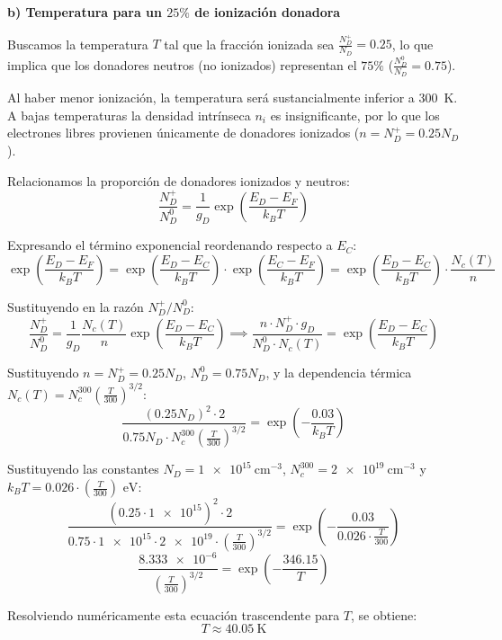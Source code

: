 \begin{problema}
\textbf{b) Temperatura para un $25\%$ de ionización donadora}

Buscamos la temperatura $T$ tal que la fracción ionizada sea $\frac{N_D^+}{N_D} = 0.25$, lo que implica que los donadores neutros (no ionizados) representan el $75\%$ ($\frac{N_D^0}{N_D} = 0.75$).

Al haber menor ionización, la temperatura será sustancialmente inferior a \SI{300}{\kelvin}. A bajas temperaturas la densidad intrínseca $n_i$ es insignificante, por lo que los electrones libres provienen únicamente de donadores ionizados ($n = N_D^+ = 0.25 N_D$).

Relacionamos la proporción de donadores ionizados y neutros:
\[
\frac{N_D^+}{N_D^0} = \frac{1}{g_D} \exp\left( \frac{E_D - E_F}{k_B T} \right)
\]

Expresando el término exponencial reordenando respecto a $E_C$:
\[
\exp\left( \frac{E_D - E_F}{k_B T} \right) = \exp\left( \frac{E_D - E_C}{k_B T} \right) \cdot \exp\left( \frac{E_C - E_F}{k_B T} \right) = \exp\left( \frac{E_D - E_C}{k_B T} \right) \cdot \frac{N_c(T)}{n}
\]

Sustituyendo en la razón $N_D^+ / N_D^0$:
\[
\frac{N_D^+}{N_D^0} = \frac{1}{g_D} \frac{N_c(T)}{n} \exp\left( \frac{E_D - E_C}{k_B T} \right) \implies \frac{n \cdot N_D^+ \cdot g_D}{N_D^0 \cdot N_c(T)} = \exp\left( \frac{E_D - E_C}{k_B T} \right)
\]

Sustituyendo $n = N_D^+ = 0.25 N_D$, $N_D^0 = 0.75 N_D$, y la dependencia térmica $N_c(T) = N_c^{300} \left( \frac{T}{300} \right)^{3/2}$:
\[
\frac{(0.25 N_D)^2 \cdot 2}{0.75 N_D \cdot N_c^{300} \left( \frac{T}{300} \right)^{3/2}} = \exp\left( -\frac{0.03}{k_B T} \right)
\]

Sustituyendo las constantes $N_D = \SI{1e15}{\cm^{-3}}$, $N_c^{300} = \SI{2e19}{\cm^{-3}}$ y $k_B T = \num{0.026} \cdot \left(\frac{T}{300}\right) \text{ eV}$:
\[
\frac{(0.25 \cdot \num{1e15})^2 \cdot 2}{0.75 \cdot \num{1e15} \cdot \num{2e19} \cdot \left( \frac{T}{300} \right)^{3/2}} = \exp\left( -\frac{0.03}{0.026 \cdot \frac{T}{300}} \right)
\]
\[
\frac{\num{8.333e-6}}{\left( \frac{T}{300} \right)^{3/2}} = \exp\left( -\frac{346.15}{T} \right)
\]

Resolviendo numéricamente esta ecuación trascendente para $T$, se obtiene:
\[
T \approx \SI{40.05}{\kelvin}
\]


\end{problema}
